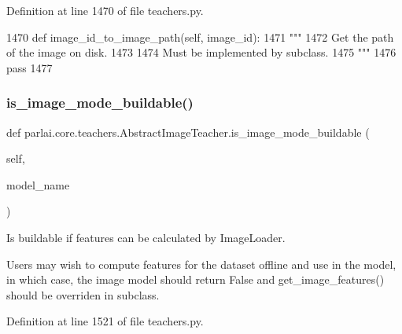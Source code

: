 Definition at line 1470 of file teachers.\+py.


\begin{DoxyCode}
1470     \textcolor{keyword}{def }image\_id\_to\_image\_path(self, image\_id):
1471         \textcolor{stringliteral}{"""}
1472 \textcolor{stringliteral}{        Get the path of the image on disk.}
1473 \textcolor{stringliteral}{}
1474 \textcolor{stringliteral}{        Must be implemented by subclass.}
1475 \textcolor{stringliteral}{        """}
1476         \textcolor{keywordflow}{pass}
1477 
\end{DoxyCode}
\mbox{\label{classparlai_1_1core_1_1teachers_1_1AbstractImageTeacher_a16c2be0ffe61e136dea2a63cbd918af5}} 
\subsubsection{\texorpdfstring{is\+\_\+image\+\_\+mode\+\_\+buildable()}{is\_image\_mode\_buildable()}}
{\footnotesize\ttfamily def parlai.\+core.\+teachers.\+Abstract\+Image\+Teacher.\+is\+\_\+image\+\_\+mode\+\_\+buildable (\begin{DoxyParamCaption}\item[{}]{self,  }\item[{}]{model\+\_\+name }\end{DoxyParamCaption})}

\begin{DoxyVerb}Is buildable if features can be calculated by ImageLoader.

Users may wish to compute features for the dataset offline and use in the model,
in which case, the image model should return False and get_image_features()
should be overriden in subclass.
\end{DoxyVerb}
 

Definition at line 1521 of file teachers.\+py.


